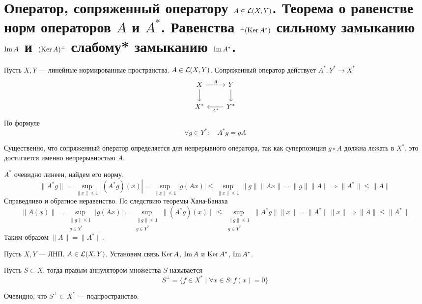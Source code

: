 \newpage
\section{Оператор, сопряженный оператору $A \in \mathcal{L}(X,Y)$. Теорема о равенстве норм операторов $A$ и $A^*$. Равенства $^\perp (\operatorname{Ker} A^*)$ сильному замыканию $\operatorname{Im} A$ и $(\operatorname{Ker} A)^\perp$ слабому* замыканию $\operatorname{Im} A^*$. }

\begin{definition}
	Пусть $X,Y$ --- линейные нормированные пространства. $A \in \mathcal{L}(X,Y)$. Сопряженный оператор действует $A^*\colon Y^* \to X^*$
	\[\begin{tikzcd}[ampersand replacement=\&]
		X \& Y \\
		{X^*} \& {Y^*}
		\arrow["A", from=1-1, to=1-2]
		\arrow[from=1-1, to=2-1]
		\arrow[from=1-2, to=2-2]
		\arrow["{A^*}", from=2-2, to=2-1]
	\end{tikzcd}\]
	По формуле $$\forall g \in Y^*:  \quad A^*g = gA$$
\end{definition}
\begin{remark}
	Существенно, что сопряженный оператор определяется для непрерывного оператора, так как суперпозиция $g \circ A$ должна лежать в $X^*$, это достигается именно непрерывностью $A$.
\end{remark}
$A^*$ очевидно линеен, найдем его норму.
$$
\|A^*g\| = \sup\limits_{\|x\| \leq 1} |(A^*g)(x)|= \sup\limits_{\|x\| \leq 1}|g(Ax)|  \leq \sup\limits_{\|x\| \leq 1}\|g\|\|Ax\| = \|g\| \|A\| \Rightarrow \|A^*\| \leq \|A\|
$$
Справедливо и обратное неравенство. По следствию теоремы Хана-Банаха
$$
\|A(x)\| = \sup\limits_{\substack{\|g\| \leq 1 \\ g \in Y^* }} |g(Ax)| = \sup\limits_{\substack{\|g\| \leq 1 \\ g \in Y^* }} \|(A^*g)(x)\| \leq  \sup\limits_{\substack{\|g\| \leq 1 \\ g \in Y^* }} \|A^*g\|\|x\| = \|A^*\| \|x\| \Rightarrow \|A\| \leq \|A^*\| 
$$
Таким образом $\|A\| = \|A^*\|$. 


Пусть $X,Y$ --- ЛНП. $A \in \mathcal{L}(X,Y)$. Установим связь $\operatorname{Ker} A$, $\operatorname{Im} A$ и $\operatorname{Ker} A^*$, $\operatorname{Im} A^*$. 
\begin{definition}
	Пусть $S \subset X$, тогда правым аннулятором множества $S$ называется 
	$$
	S^\perp = \{f \in X^* \mid \forall x \in S: f(x) = 0\}
	$$
\end{definition}
Очевидно, что $S^\perp \subset X^*$ --- подпространство. 

